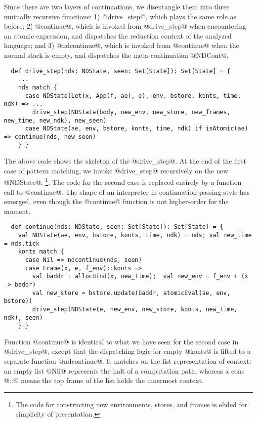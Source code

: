 \documentclass[acmsmall, screen]{acmart}\settopmatter{}
\begin{document}
Since there are two layers of continuations, we disentangle them into three mutually recursive
functions:
1) @drive_step@, which plays the same role as before;
2) @continue@, which is invoked from @drive_step@ when encountering an atomic expression,
  and dispatches the reduction context of the analyzed language; and
3) @ndcontinue@, which is invoked from @continue@ when the normal stack is empty,
  and dispatches the meta-continuation @NDCont@.

\begin{lstlisting}
  def drive_step(nds: NDState, seen: Set[State]): Set[State] = {
    ...
    nds match {
      case NDState(Let(x, App(f, ae), e), env, bstore, konts, time, ndk) => ...
        drive_step(NDState(body, new_env, new_store, new_frames, new_time, new_ndk), new_seen)
      case NDState(ae, env, bstore, konts, time, ndk) if isAtomic(ae) => continue(nds, new_seen)
    } }
\end{lstlisting}

The above code shows the skeleton of the @drive_step@.
At the end of the first case of pattern matching, we invoke @drive_step@ recursively
on the new @NDState@.
\footnote{The code for constructing new environments, stores, and frames is elided for
simplicity of presentation.}.
The code for the second case is replaced entirely by a function call to @continue@.
The shape of an interpreter in continuation-passing style has emerged, even though
the @continue@ function is not higher-order for the moment.

\begin{lstlisting}
  def continue(nds: NDState, seen: Set[State]): Set[State] = {
    val NDState(ae, env, bstore, konts, time, ndk) = nds; val new_time = nds.tick
    konts match {
      case Nil => ndcontinue(nds, seen)
      case Frame(x, e, f_env)::konts =>
        val baddr = allocBind(x, new_time);  val new_env = f_env + (x -> baddr)
        val new_store = bstore.update(baddr, atomicEval(ae, env, bstore))
        drive_step(NDState(e, new_env, new_store, konts, new_time, ndk), seen)
    } }
\end{lstlisting}

Function @continue@ is identical to what we have seen for the second case in @drive_step@,
except that the dispatching logic for empty @konts@ is lifted to a separate function
@ndcontinue@.
It matches on the list representation of context: an empty list @Nil@ represents the
halt of a computation path, whereas a cons @::@ means the top frame of the list
holds the innermost context.
\end{document}
